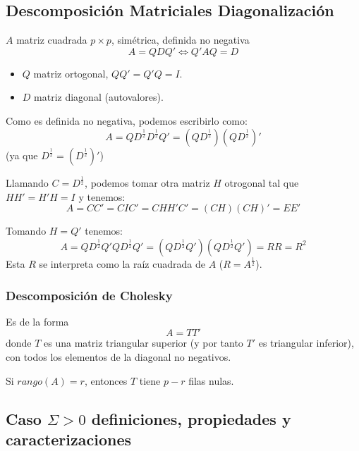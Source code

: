 \documentclass[11pt,a4paper]{article}
\begin{document}
\subsection{Descomposición Matriciales Diagonalización}

$A$ matriz cuadrada $p \times p$, simétrica, definida no negativa
$$A = QDQ' \iff Q'AQ = D$$
\begin{itemize}
\item $Q$ matriz ortogonal, $QQ' = Q'Q = I$.
\item $D$ matriz diagonal (autovalores).
\end{itemize}

Como es definida no negativa, podemos escribirlo como:
$$A = QD^{\frac{1}{2}}D^{\frac{1}{2}}Q' = (QD^{\frac{1}{2}})(QD^{\frac{1}{2}})'$$
(ya que $D^{\frac{1}{2}} = (D^{\frac{1}{2}})'$)

Llamando $C = D^{\frac{1}{2}}$, podemos tomar otra matriz $H$ otrogonal tal que $HH' = H'H = I$ y tenemos:
$$A = CC' = CIC' = CHH'C' = (CH)(CH)' = EE'$$

Tomando $H = Q'$ tenemos:
$$A = QD^{\frac{1}{2}}Q'QD^{\frac{1}{2}}Q' = (QD^{\frac{1}{2}}Q')(QD^{\frac{1}{2}}Q') = RR = R^{2}$$
Esta $R$ se interpreta como la raíz cuadrada de $A$ ($R = A^{\frac{1}{2}}$).

\subsubsection{Descomposición de Cholesky}

Es de la forma
$$A = TT'$$
donde $T$ es una matriz triangular superior (y por tanto $T'$ es triangular inferior), con todos los elementos de la diagonal no negativos.

Si $rango(A) = r$, entonces $T$ tiene $p - r$ filas nulas.

\subsection{Caso \texorpdfstring{$\Sigma > 0$}: definiciones, propiedades y caracterizaciones}
\end{document}
